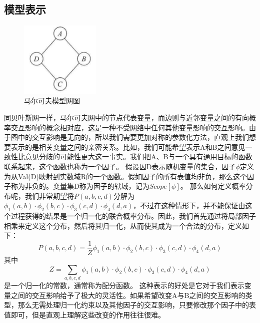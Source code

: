 \documentclass{article} %
\begin{document}
\begin{CJK*}{UTF8}{gkai}
\subsection{模型表示}
\begin{figure}[h]
\begin{center}

\includegraphics[width=1.5in]{5.png}

\end{center}
\caption{马尔可夫模型网图}
\end{figure}

同贝叶斯网一样，马尔可夫网中的节点代表变量，而边则与近邻变量之间的有向概率交互影响的概念相对应，这是一种不受网络中任何其他变量影响的交互影响。由于图中的交互影响是无向的，所以我们需要更加对称的参数化方法，直观上我们想要表示的是相关变量之间的亲密关系。比如，我们可能希望表示A和B之间意见一致性比意见分歧的可能性更大这一事实。我们把A、B与一个具有通用目标的函数联系起来，这个函数也称为一个因子。
假设因D表示随机变量的集合，因子$\phi$定义为从Val(D)映射到实数域R的一个函数。假如因子的所有表值均非负，那么这个因子称为非负的。变量集D称为因子的辖域，记为$Scope[\phi]$。
那么如何定义概率分布呢，我们非常期望将$P \left( a,b,c,d \right)$分解为$\phi _{1} \left( a,b \right) \cdot \phi _{2} \left( b,c \right) \cdot \phi _{3} \left( c,d \right) \cdot \phi _{4} \left( d,a \right)$，不过在这种情形下，并不能保证由这个过程获得的结果是一个归一化的联合概率分布。因此，我们首先通过将局部因子相乘来定义这个分布，然后将其归一化，从而使其成为一个合法的分布，定义如下：
\begin{equation}
P \left( a,b,c,d \right)=\frac{1}{Z} \phi _{1} \left( a,b \right) \cdot \phi _{2} \left( b,c \right) \cdot \phi _{3} \left( c,d \right) \cdot \phi _{4} \left( d,a \right)
\end{equation}
其中
\[Z=\sum _{a,b,c,d} \phi _{1} \left( a,b \right) \cdot \phi _{2} \left( b,c \right) \cdot \phi _{3} \left( c,d \right) \cdot \phi _{4} \left( d,a \right)\]
是一个归一化的常数，通常称为配分函数。
这种表示的好处是它对于我们表示变量之间的交互影响给予了极大的灵活性。如果希望改变A与B之间的交互影响的类型，那么无需处理归一化约束以及其他因子的交互影响，只要修改那个因子中的表值即可，但是直观上理解这些改变的作用往往很难。


\end{CJK*}
\end{document}
